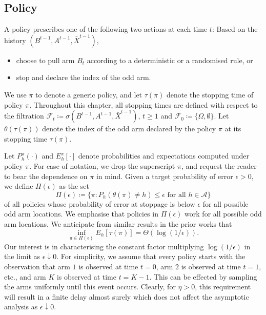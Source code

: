 \subsection{Policy}
A policy prescribes one of the following two actions at each time $t$: Based on the history $(B^{t-1},A^{t-1},\bar{X}^{t-1})$,
\begin{itemize}
	\item choose to pull arm $B_t$ according to a deterministic or a randomised rule, or
	\item stop and declare the index of the odd arm.
\end{itemize}
We use $\pi$ to denote a generic policy, and let $\tau(\pi)$ denote the stopping time of policy $\pi$. Throughout this chapter, all stopping times are defined with respect to the filtration $\mathcal{F}_t\coloneqq\sigma(B^{t-1},A^{t-1},\bar{X}^{t-1})$, $t\geq 1$ and $\mathcal{F}_{0}\coloneqq \{\Omega,\emptyset\}$. Let $\theta(\tau(\pi))$ denote the index of the odd arm declared by the policy $\pi$ at its stopping time $\tau(\pi)$.

Let $P_h^\pi(\cdot)$ and $E_h^\pi[\cdot]$ denote probabilities and expectations computed under policy $\pi$. For ease of notation, we drop the superscript $\pi$, and {\color{black} request the  reader} to bear the dependence on $\pi$ in mind. Given a target probability of error $\epsilon>0$, we define $\Pi(\epsilon)$ as the set
\begin{equation}
	\Pi(\epsilon)\coloneqq \{\pi:P_h(\theta(\pi)\neq h)\leq \epsilon\text{ for all }h\in\mathcal{A}\}\label{restless_with_known_eq:Pi(epsilon)}
\end{equation}
of all policies whose probability of error at stoppage is below $\epsilon$ {for all possible odd arm locations}. We emphasise that policies in $\Pi(\epsilon)$ work for all possible odd arm locations. We anticipate from similar results in the prior works that $$\inf\limits_{\pi\in\Pi(\epsilon)}E_h[\tau(\pi)] = \Theta(\log(1/\epsilon)).$$
Our interest is in characterising the constant factor multiplying $\log(1/\epsilon)$ {\color{black} in the limit as $\epsilon\downarrow 0$. For simplicity, we assume that every policy starts with the observation that arm $1$ is observed at time $t=0$, arm $2$ is observed at time $t=1$, etc., and arm $K$ is observed at time $t=K-1$. This can be effected by sampling the arms uniformly until this event occurs. Clearly, for $\eta > 0$, this requirement will result in a finite delay almost surely which does not affect the asymptotic analysis as $\epsilon \downarrow 0$.}

